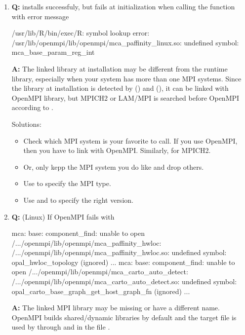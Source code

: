 \begin{enumerate}
\item {\bf\color{blue} Q:}
       installs successfuly, but fails at initialization when
      calling the function  with error message
\begin{Error}
/usr/lib/R/bin/exec/R: symbol lookup error:
/usr/lib/openmpi/lib/openmpi/mca_paffinity_linux.so: undefined symbol:
mca_base_param_reg_int
\end{Error}
      {\bf\color{blue} A:}
      The linked library at installation may be different from the runtime
      library, especially when your system has more than one MPI systems.
      Since the library at installation is detected by
       () and  (),
      it can be linked with OpenMPI library, but MPICH2 or LAM/MPI is searched
      before OpenMPI according to .

      Solutions:
      \begin{itemize}
      \item Check which MPI system is your favorite to call. If you use
            OpenMPI, then you have to link with OpenMPI. Similarly, for
            MPICH2.
      \item Or, only kepp the MPI system you do like and drop others.
      \item Use \code{-} to specify the MPI type.
      \item Use \code{-} and
            \code{-} to
            specify the right version.
      \end{itemize}

\item {\bf\color{blue} Q:}
      (Linux) If OpenMPI  fails with
\begin{Error}
mca: base: component_find: unable to open
/.../openmpi/lib/openmpi/mca_paffinity_hwloc:
/.../openmpi/lib/openmpi/mca_paffinity_hwloc.so:
undefined symbol: opal_hwloc_topology (ignored)
...
mca: base: component_find: unable to open
/.../openmpi/lib/openmpi/mca_carto_auto_detect:
/.../openmpi/lib/openmpi/mca_carto_auto_detect.so:
undefined symbol: opal_carto_base_graph_get_host_graph_fn (ignored)
...
\end{Error}
      {\bf\color{blue} A:}
      The linked MPI library  may be missing or have a
      different name.
      OpenMPI builds shared/dynamic libraries by default and the target
      file  is used by 
      through  and  in the file
      .


\end{enumerate}

